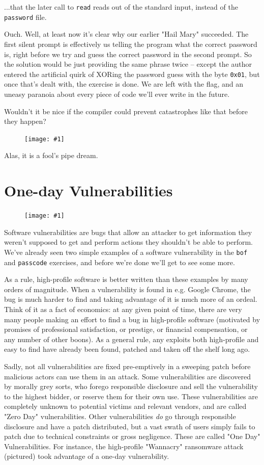 \documentclass{article}
\newcommand{\displayimage}[1] {
\begin{figure}[H]
    \centering
    \texttt{[image: \#1]} 
\end{figure}
}
\newcommand{\wrapimageright}[1] {
    \begin{figure}
        \begin{center}
            \texttt{[image: \#1]} 
        \end{center}
    \end{figure}
}
\newcommand{\xcode}[2]{\colorbox{ubuntuback}{\lstinline[language=#1]|#2|}}
\newcommand{\code}[1]{\colorbox{ubuntuback}{\texttt{#1}}}
\begin{document}
...that the later call to \xcode{C}{read} reads out of the standard input, instead of the \code{password} file.

Ouch. Well, at least now it's clear why our earlier "Hail Mary" succeeded. The first silent prompt is effectively us telling the program what the correct password is, right before we try and guess the correct password in the second prompt. So the solution would be just providing the same phrase twice -- except the author entered the artificial quirk of XORing the password guess with the byte \code{0x01}, but once that's dealt with, the exercise is done. We are left with the flag, and an uneasy paranoia about every piece of code we'll ever write in the future.

Wouldn't it be nice if the compiler could prevent catastrophes like that before they happen?

\displayimage{./exercises/08_mistake/in_rust/rendered.png}

Alas, it is a fool's pipe dream.

\section{One-day Vulnerabilities}

\wrapimageright{./images/wannacry.jpg}
Software vulnerabilities are bugs that allow an attacker to get information they weren't supposed to get and perform actions they shouldn't be able to perform. We've already seen two simple examples of a software vulnerability in the \code{bof} and \code{passcode} exercises, and before we're done we'll get to see some more.

As a rule, high-profile software is better written than these examples by many orders of magnitude. When a vulnerability is found in e.g. Google Chrome, the bug is much harder to find and taking advantage of it is much more of an ordeal. Think of it as a fact of economics: at any given point of time, there are very many people making an effort to find a bug in high-profile software (motivated by promises of professional satisfaction, or prestige, or financial compensation, or any number of other boons). As a general rule, any exploits both high-profile and easy to find have already been found, patched and taken off the shelf long ago.

Sadly, not all vulnerabilities are fixed pre-emptively in a sweeping patch before malicious actors can use them in an attack. Some vulnerabilities are discovered by morally grey sorts, who forego responsible disclosure and sell the vulnerability to the highest bidder, or reserve them for their own use. These vulnerabilities are completely unknown to potential victims and relevant vendors, and are called "Zero Day" vulnerabilities. Other vulnerabilities \textit{do} go through responsible disclosure and have a patch distributed, but a vast swath of users simply fails to patch due to technical constraints or gross negligence. These are called "One Day" Vulnerabilities. For instance, the high-profile "Wannacry" ransomware attack (pictured) took advantage of a one-day vulnerability.
\end{document}
